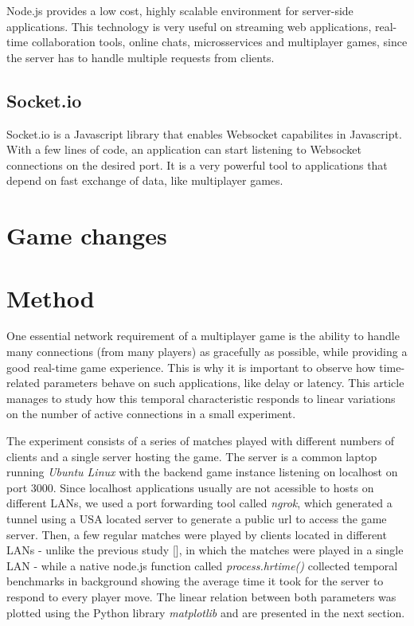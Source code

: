 \documentclass[english]{sbrt}
\begin{document}
Node.js provides a low cost, highly scalable environment for server-side applications. This technology is very useful on streaming web applications, real-time collaboration tools, online chats, microsservices and multiplayer games, since the server has to handle multiple requests from clients.

\subsection{\textbf{Socket.io}}
Socket.io is a Javascript library that enables Websocket capabilites in Javascript. With a few lines of code, an application can start listening to Websocket connections on the desired port. It is a very powerful tool to applications that depend on fast exchange of data, like multiplayer games.

\section{\textbf{Game changes}}

\section{\textbf{Method}}

One essential network requirement of a multiplayer game is the ability to handle many connections (from many players) as gracefully as possible, while providing a good real-time game experience. This is why it is important to observe how time-related parameters behave on such applications, like delay or latency. This article manages to study how this temporal characteristic responds to linear variations on the number of active connections in a small experiment.

The experiment consists of a series of matches played with different numbers of clients and a single server hosting the game.
The server is a common laptop running \textit{Ubuntu Linux} with the backend game instance listening on localhost on port 3000. Since localhost applications usually are not acessible to hosts on different LANs, we used a port forwarding tool called \textit{ngrok}, which generated a tunnel using a USA located server to generate a public url to access the game server. Then, a few regular matches were played by clients located in different LANs - unlike the previous study [], in which the matches were played in a single LAN - while a native node.js function called \textit{process.hrtime()} collected temporal benchmarks in background showing the average time it took for the server to respond to every player move. The linear relation between both parameters was plotted using the Python library \textit{matplotlib} and are presented in the next section.
\end{document}
